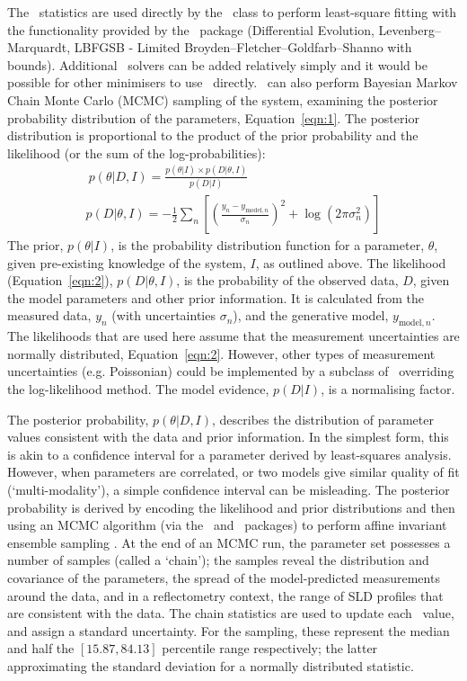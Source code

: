 \documentclass[pdf,preprint]{article}
\begin{document}
The \Objective\ statistics are used directly by the \CurveFitter\ class to perform least-square fitting with the functionality provided by the \SciPy\ package (Differential  Evolution, Levenberg--Marquardt, LBFGSB - Limited Broyden--Fletcher--Goldfarb--Shanno with bounds). Additional \SciPy\ solvers can be added relatively simply and it would be possible for other minimisers to use \Objective\ directly.
\CurveFitter\ can also perform Bayesian Markov Chain Monte Carlo (MCMC) sampling of the system, examining the posterior probability distribution of the parameters, Equation~\ref{eqn:1}. The posterior distribution is proportional to the product of the prior probability and the likelihood (or the sum of the log-probabilities):
%
\begin{gather} 
\label{eqn:1}\ p(\theta | D, I) = \frac{p(\theta | I)\times p(D | \theta, I)}{p(D | I)}\\
p(D | \theta, I) = -\frac{1}{2} \sum_n \left[\left(\frac{y_n - y_{\mathrm{model},n}} {\sigma_n}\right)^2 + \log(2\pi\sigma_n^2)\right]\label{eqn:2}
\end{gather}
%
The prior, $p(\theta | I)$, is the probability distribution function for a parameter, $\theta$, given pre-existing knowledge of the system, $I$, as outlined above.
The likelihood (Equation~\ref{eqn:2}), $p(D | \theta, I)$, is the probability of the observed data, $D$, given the model parameters and other prior information. It is calculated from the measured data, $y_n$ (with uncertainties $\sigma_n$), and the generative model, $y_{\mathrm{model},n}$. The likelihoods that are used here assume that the measurement uncertainties are normally distributed, Equation~\ref{eqn:2}. However, other types of measurement uncertainties (e.g. Poissonian) could be implemented by a subclass of \Objective\ overriding the log-likelihood method.
The model evidence, $p(D | I)$, is a normalising factor.

The posterior probability, $p(\theta | D, I)$, describes the distribution of parameter values consistent with the data and prior information. In the simplest form, this is akin to a confidence interval for a parameter derived by least-squares analysis. However, when parameters are correlated, or two models give similar quality of fit (`multi-modality'), a simple confidence interval can be misleading.
The posterior probability is derived by encoding the likelihood and prior distributions and then using an MCMC algorithm (via the \emcee\ and \ptemcee\ packages) to perform affine invariant ensemble sampling \cite{emcee, ptemcee}.
At the end of an MCMC run, the parameter set possesses a number of samples (called a `chain'); the samples reveal the distribution and covariance of the parameters, the spread of the model-predicted measurements around the data, and in a reflectometry context, the range of SLD profiles that are consistent with the data.
The chain statistics are used to update each \Parameter\ value, and assign a standard uncertainty. For the sampling, these represent the median and half the $[15.87, 84.13]$ percentile range respectively; the latter approximating the standard deviation for a normally distributed statistic.
\end{document}
